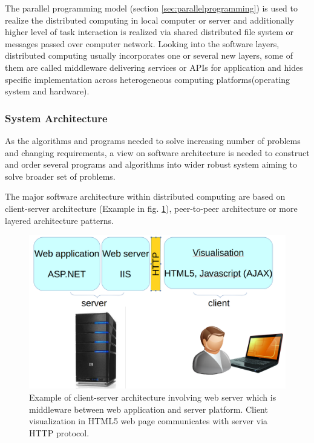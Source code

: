 The parallel programming model (section \ref{sec:parallelprogramming}) is used to realize the distributed computing in local computer or server and additionally higher level of task interaction is realized via shared distributed file system or messages passed over computer network. 
Looking into the software layers, distributed computing usually incorporates one or several new layers, some of them are called middleware  delivering services or APIs for application and hides specific implementation across heterogeneous computing platforms(operating system and hardware).

\subsubsection{System Architecture}

As the algorithms and programs needed to solve increasing number of problems and changing requirements, a view on software architecture is needed to construct and order several programs and algorithms into wider robust system aiming to solve broader set of problems.


The major software architecture within distributed computing are based on client-server architecture (Example in fig. \ref{fig:architecture}), peer-to-peer architecture or more layered architecture patterns.
\begin{figure}[ht]
    \centering
    \includegraphics[width=1\textwidth]{chapter2/architektura.png}
    \caption{Example of client-server architecture involving web server which is middleware between web application and server platform. Client visualization in HTML5 web page communicates with server via HTTP protocol.}
    \label{fig:architecture}
\end{figure}


